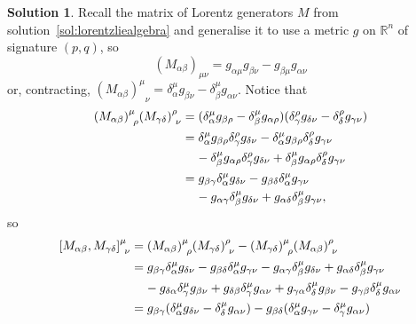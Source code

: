 \documentclass[11pt, a4paper]{report}
\theoremstyle{definition}
\newtheorem{solution}{Solution}[part]
\newenvironment{sol}{\begin{solution}}{\end{solution}\pagebreak[3]}
\newcommand*{\pheq}{\ensuremath\mathrel{\phantom{=}}\negmedspace{}}
\begin{document}
\begin{sol}
Recall the matrix of Lorentz generators $M$ from solution~\ref{sol:lorentzliealgebra} and generalise it to use a metric $g$ on $\mathbb{R}^n$ of signature $(p, q)$, so
\[
    {(M_{\alpha\beta})}_{\mu\nu}
        = g_{\alpha\mu} g_{\beta\nu} - g_{\beta\mu} g_{\alpha\nu}
\]
or, contracting, ${{(M_{\alpha\beta})}^\mu\!}_\nu = \delta^\mu_\alpha g_{\beta\nu} - \delta^\mu_\beta g_{\alpha\nu}$.
Notice that
\begin{align*}
    {{(M_{\alpha\beta})}^\mu\!}_\rho {{(M_{\gamma\delta})}^\rho\!}_\nu
        &= (\delta^\mu_\alpha g_{\beta\rho} - \delta^\mu_\beta g_{\alpha\rho})
           (\delta^\rho_\gamma g_{\delta\nu} - \delta^\rho_\delta g_{\gamma\nu}) \\
        &= \delta^\mu_\alpha g_{\beta\rho} \delta^\rho_\gamma g_{\delta\nu}
           - \delta^\mu_\alpha g_{\beta\rho} \delta^\rho_\delta g_{\gamma\nu} \\
        &\pheq
           - \delta^\mu_\beta g_{\alpha\rho} \delta^\rho_\gamma g_{\delta\nu}
           + \delta^\mu_\beta g_{\alpha\rho} \delta^\rho_\delta g_{\gamma\nu} \\
        &= g_{\beta\gamma} \delta^\mu_\alpha g_{\delta\nu}
           - g_{\beta\delta} \delta^\mu_\alpha g_{\gamma\nu} \\
        &\pheq
           - g_{\alpha\gamma} \delta^\mu_\beta g_{\delta\nu}
           + g_{\alpha\delta} \delta^\mu_\beta g_{\gamma\nu},
\end{align*}
so
\begin{align*}
    {{[M_{\alpha\beta}, M_{\gamma\delta}]}^\mu\!}_\nu
        &= {{(M_{\alpha\beta})}^\mu\!}_\rho {{(M_{\gamma\delta})}^\rho\!}_\nu
           - {{(M_{\gamma\delta})}^\mu\!}_\rho {{(M_{\alpha\beta})}^\rho\!}_\nu \\
        &= g_{\beta\gamma} \delta^\mu_\alpha g_{\delta\nu}
           - g_{\beta\delta} \delta^\mu_\alpha g_{\gamma\nu}
           - g_{\alpha\gamma} \delta^\mu_\beta g_{\delta\nu}
           + g_{\alpha\delta} \delta^\mu_\beta g_{\gamma\nu} \\
        &\pheq
           - g_{\delta\alpha} \delta^\mu_\gamma g_{\beta\nu}
           + g_{\delta\beta} \delta^\mu_\gamma g_{\alpha\nu}
           + g_{\gamma\alpha} \delta^\mu_\delta g_{\beta\nu}
           - g_{\gamma\beta} \delta^\mu_\delta g_{\alpha\nu} \\
        &= g_{\beta\gamma} (\delta^\mu_\alpha g_{\delta\nu}
                            - \delta^\mu_\delta g_{\alpha\nu})
           - g_{\beta\delta} (\delta^\mu_\alpha g_{\gamma\nu}
                              - \delta^\mu_\gamma g_{\alpha\nu}) \\

\end{align*}
\end{sol}
\end{document}
